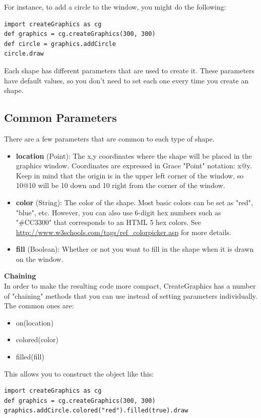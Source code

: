 \documentclass{article}
\begin{document}
For instance, to add a circle to the window, you might do the following:
\begin{lstlisting}
import createGraphics as cg
def graphics = cg.createGraphics(300, 300)
def circle = graphics.addCircle
circle.draw
\end{lstlisting}
Each shape has different parameters that are used to create it. These parameters have default values, so you don't need to set each
one every time you create an shape.

\subsection{Common Parameters}
There are a few parameters that are common to each type of shape.

\begin{itemize}
\item \textbf{location} (Point): The x,y coordinates where the shape will be placed in the graphics window. Coordinates are expressed in Grace "Point" notation: x@y. Keep in mind that the origin is in the upper left corner of the window, so 10@10 will be 10 down and 10 right from the corner of the window.
\item \textbf{color} (String): The color of the shape. Most basic colors can be set as "red", "blue", etc. However, you can also use 6-digit hex numbers 
such as "\#CC3300" that corresponds to an HTML 5 hex colors. See \url{http://www.w3schools.com/tags/ref_colorpicker.asp} for more details.
\item \textbf{fill} (Boolean): Whether or not you want to fill in the shape when it is drawn on the window.
\end{itemize}

\textbf{Chaining} \\
In order to make the resulting code more compact, CreateGraphics has a number of "chaining"
methods that you can use instead of setting parameters individually. The common ones are:
\begin{itemize}
\item on(location)
\item colored(color)
\item filled(fill)
\end{itemize}

This allows you to construct the object like this:

\begin{lstlisting}
import createGraphics as cg
def graphics = cg.createGraphics(300, 300)
graphics.addCircle.colored("red").filled(true).draw
\end{lstlisting}
\end{document}
